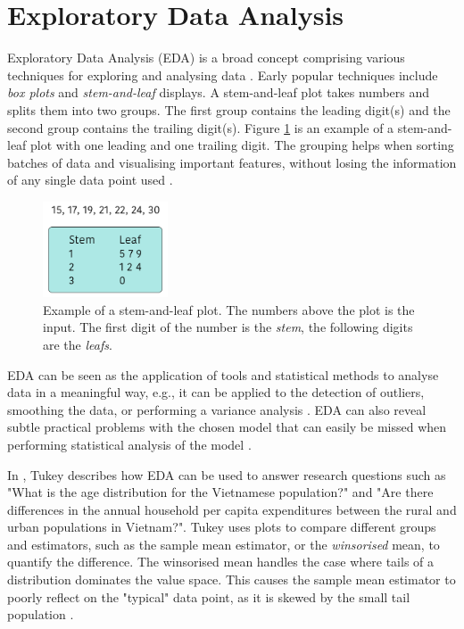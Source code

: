 
\section{Exploratory Data Analysis}
Exploratory Data Analysis (EDA) is a broad concept comprising various techniques for exploring and analysing data \cite{Anselin1999, Gelman2003, Hoaglin2003, Tukey1977, Velleman1981}.
Early popular techniques include \emph{box plots} and \emph{stem-and-leaf} displays.
A stem-and-leaf plot takes numbers and splits them into two groups.
The first group contains the leading digit(s) and the second group contains the trailing digit(s).
Figure \ref{fig:stem-leaf-plot} is an example of a stem-and-leaf plot with one leading and one trailing digit.
The grouping helps when sorting batches of data and visualising important features, without losing the information of any single data point used \cite{Velleman1981}.

\begin{figure} [h!]
    \centering
    \includegraphics[width=0.33\textwidth]{figures/stem-leaf-plot}
    \caption[Example of a stem-and-leaf plot]
    {\small Example of a stem-and-leaf plot. The numbers above the plot is the input.
    The first digit of the number is the \emph{stem}, the following digits are the \emph{leafs}.}
    \label{fig:stem-leaf-plot}
\end{figure}

EDA can be seen as the application of tools and statistical methods to analyse data in a meaningful way, e.g., it can be applied to the detection of outliers, smoothing the data, or performing a variance analysis \cite{Anselin1999, Hoaglin2003, Tukey1977, Velleman1981}.
EDA can also reveal subtle practical problems with the chosen model that can easily be missed when performing statistical analysis of the model \cite{Gelman2003}.

In \cite{Tukey1977}, Tukey describes how EDA can be used to answer research questions such as "What is the age distribution for the Vietnamese population?" and "Are there differences in
the annual household per capita expenditures between the rural and urban populations in Vietnam?".
Tukey uses plots to compare different groups and estimators, such as the sample mean estimator, or the \emph{winsorised} mean, to quantify the difference.
The winsorised mean handles the case where tails of a distribution dominates the value space.  
This causes the sample mean estimator to poorly reflect on the "typical" data point, as it is skewed by the small tail population \cite{Tukey1977}.


